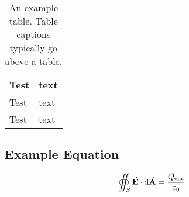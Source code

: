 \documentclass[a4paper, 12pt, english]{article}
\begin{document}
            \begin{table}[!h]
                \centering
                \caption{An example table. Table captions typically go above a table.}
                \label{table: example}
                \begin{tabular}{ |C{0.2\textwidth}|m{0.2\textwidth}| }
                    \hline
                    Test & text\\
                    \hline
                    \hline
                    Test & text\\
                    \hline
                    Test & text\\
                    \hline
                \end{tabular}
            \end{table}

        \subsection{Example Equation}
            \label{app: example equation}

            \begin{equation}
                \oiint_S \vect{E} \cdot \d\vect{A} = \frac{Q_{\text{enc}}}{\varepsilon_0}
                \label{eq: Gauss Law}
            \end{equation}
\end{document}
